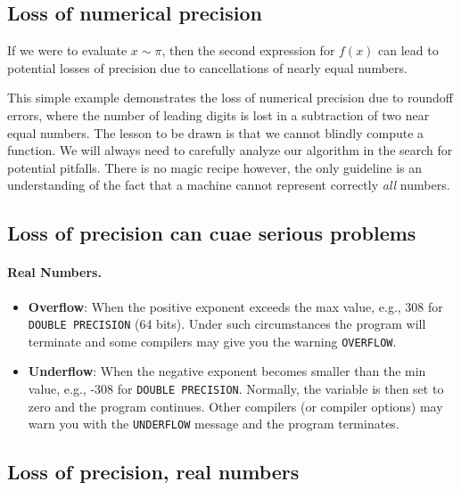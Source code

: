 \documentclass[%
oneside,                 %
final,                   %
10pt]{article}
\begin{document}
\subsection*{Loss of numerical precision}

If we were to evaluate $x\sim \pi$, then the second expression for $f(x)$
can lead to potential losses of precision due to cancellations of nearly
equal numbers.

This simple example demonstrates  the loss of numerical precision due
to roundoff errors, where the number of leading digits is lost
in a subtraction of two near equal numbers.
The lesson to be drawn is that we cannot blindly compute a function.
We will always need to carefully analyze our algorithm in the search for
potential pitfalls. There is no magic recipe however, the only guideline
is an understanding of the fact that a machine cannot represent
correctly \emph{all} numbers.

\subsection*{Loss of precision can cuae serious problems}


\paragraph{Real Numbers.}

\begin{itemize}
  \item \textbf{Overflow}: When the positive exponent exceeds the max value, e.g., 308 for \Verb!DOUBLE PRECISION! (64 bits). Under such circumstances the program will terminate and some compilers may give you the warning \Verb!OVERFLOW!.

  \item \textbf{Underflow}: When the negative exponent becomes smaller than the min value, e.g., -308 for \Verb!DOUBLE PRECISION!. Normally, the variable is then set to zero and the program continues. Other compilers (or compiler options) may warn you with the \Verb!UNDERFLOW! message and the program terminates.
\end{itemize}

\noindent



\subsection*{Loss of precision, real numbers}
\end{document}

